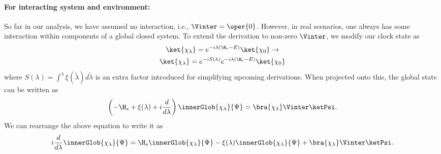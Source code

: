 \paragraph{For interacting system and environment:} So far in our analysis, we have assumed 
no interaction, i.e., \(\Vinter = \oper{0}\). However, in real scenarios, one always has some
interaction within components of a global closed system. To extend the derivation to 
non-zero \(\Vinter\), we modify our clock state as
\begin{equation}
   \begin{gathered}
      \ket{\chi_\lambda} = e^{-i\lambda(\H_c - E)}\ket{\chi_0} \to \\\ket{\chi_\lambda}
       = e^{-iS(\lambda)}e^{-i\lambda(\H_c - E)}\ket{\chi_0}
   \end{gathered}
\end{equation}
where \(S(\lambda) = \int^{\lambda}\xi(\tilde{\lambda} ) d\tilde{\lambda}\) is an extra factor introduced for 
simplifying upcoming derivations. When  projected onto this, the global state can be written as
\begin{equation}
\label{eq:TISE_undecomposed}
    \left(-\H_s + \xi(\lambda) + i\dfrac{d}{d\lambda}\right) 
    \innerGlob{\chi_\lambda}{\Psi} = \bra{\chi_\lambda}\Vinter\ketPsi.
\end{equation}
We can rearrange the above equation to write it as
\begin{equation}
\label{eq:TISE_undecomposed_simp}
    \begin{gathered}
         i\dfrac{d}{d\lambda}\innerGlob{\chi_\lambda}{\Psi} =
          \H_s\innerGlob{\chi_\lambda}{\Psi} - \xi(\lambda)\innerGlob{\chi_\lambda}{\Psi}  + \bra{\chi_\lambda}\Vinter\ketPsi.
    \end{gathered}
\end{equation}

